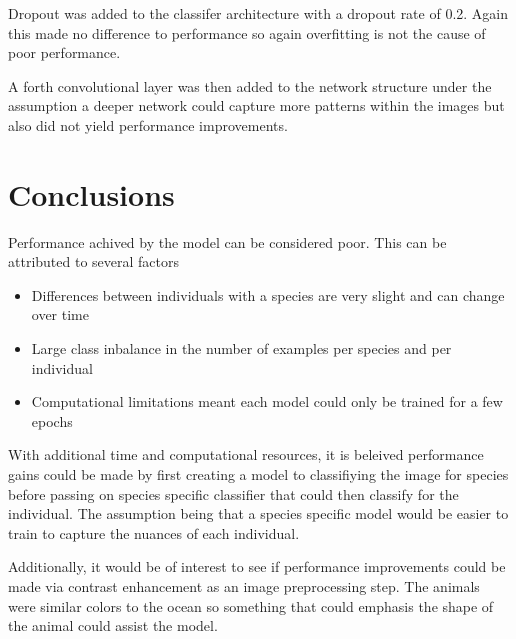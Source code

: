\documentclass{article}
\begin{document}
Dropout was added to the classifer architecture with a dropout rate of 0.2. Again this made no difference to performance so again overfitting is not the cause of poor performance.

A forth convolutional layer was then added to the network structure under the assumption a deeper network could capture more patterns within the images but also did not yield performance improvements. 

\section{Conclusions}

Performance achived by the model can be considered poor. This can be attributed to several factors

\begin{itemize}
    \item Differences between individuals with a species are very slight and can change over time
    \item Large class inbalance in the number of examples per species and per individual
    \item Computational limitations meant each model could only be trained for a few epochs
\end{itemize}

With additional time and computational resources, it is beleived performance gains could be made by first creating a model to classifiying the image for 
species before passing on species specific classifier that could then classify for the individual. The assumption being that a species specific model would
be easier to train to capture the nuances of each individual.


Additionally, it would be of interest to see if performance improvements could be made via contrast enhancement as an image preprocessing step. The animals were 
similar colors to the ocean so something that could emphasis the shape of the animal could assist the model.





\end{document}
